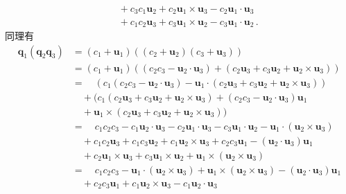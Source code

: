 \begin{prove}
\begin{align}
                                      & \quad +c_3c_1{\bm u}_2+c_2{\bm u}_1\times{\bm u}_3-c_2{\bm u}_1\cdot{\bm u}_3\nonumber                                                              \\
                                      & \quad +c_1c_2{\bm u}_3+c_3{\bm u}_1\times{\bm u}_2-c_3{\bm u}_1\cdot{\bm u}_2\, .
    \end{align}
    同理有
    \begin{align}
        {\bm q}_1({\bm q}_2{\bm q}_3) & =(c_1+{\bm u}_1)((c_2+{\bm u}_2)(c_3+{\bm u}_3))\nonumber                                                                                           \\
                                      & =(c_1+{\bm u}_1)((c_2c_3-{\bm u}_2\cdot{\bm u}_3)+(c_2{\bm u}_3+c_3{\bm u}_2+{\bm u}_2\times{\bm u}_3))\nonumber                                    \\
                                      & =\quad(c_1(c_2c_3-{\bm u}_2\cdot{\bm u}_3)-{\bm u}_1\cdot(c_2{\bm u}_3+c_3{\bm u}_2+{\bm u}_2\times{\bm u}_3))\nonumber                             \\
                                      & \quad +(c_1(c_2{\bm u}_3+c_3{\bm u}_2+{\bm u}_2\times{\bm u}_3)+(c_2c_3-{\bm u}_2\cdot{\bm u}_3){\bm u}_1\nonumber                                  \\
                                      & \quad +{\bm u}_1\times(c_2{\bm u}_3+c_3{\bm u}_2+{\bm u}_2\times{\bm u}_3))\nonumber                                                                \\
                                      & =\quad c_1c_2c_3-c_1{\bm u}_2\cdot{\bm u}_3-c_2{\bm u}_1\cdot{\bm u}_3-c_3{\bm u}_1\cdot{\bm u}_2-{\bm u}_1\cdot({\bm u}_2\times{\bm u}_3)\nonumber \\
                                      & \quad +c_1c_2{\bm u}_3+c_1c_3{\bm u}_2+c_1{\bm u}_2\times{\bm u}_3+c_2c_3{\bm u}_1-({\bm u}_2\cdot{\bm u}_3){\bm u}_1\nonumber                      \\
                                      & \quad +c_2{\bm u}_1\times{\bm u}_3+c_3{\bm u}_1\times{\bm u}_2+{\bm u}_1\times({\bm u}_2\times{\bm u}_3)\nonumber                                   \\
                                      & =\quad c_1c_2c_3-{\bm u}_1\cdot({\bm u}_2\times{\bm u}_3)+{\bm u}_1\times({\bm u}_2\times{\bm u}_3)-({\bm u}_2\cdot{\bm u}_3){\bm u}_1\nonumber     \\
                                      & \quad +c_2c_3{\bm u}_1+c_1{\bm u}_2\times{\bm u}_3-c_1{\bm u}_2\cdot{\bm u}_3\nonumber                                                              \\

\end{align}
\end{prove}
